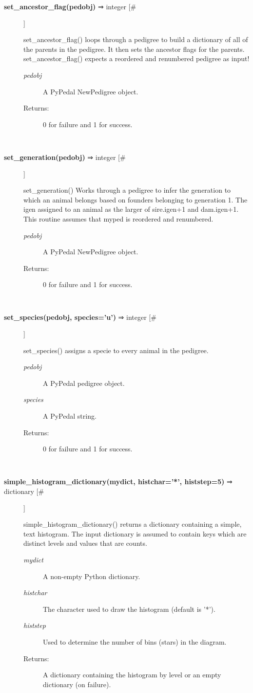 \begin{description}
\item[\textbf{set\_ancestor\_flag(pedobj)} ⇒ integer [\#]
]
\par set\_ancestor\_flag() loops through a pedigree to build a dictionary of all of the parents
in the pedigree.  It then sets the ancestor flags for the parents.  set\_ancestor\_flag()
expects a reordered and renumbered pedigree as input!
\begin{description}
\item[\textit{pedobj}
]
A PyPedal NewPedigree object.
\item[Returns:
]
0 for failure and 1 for success.
\end{description}\\

\item[\textbf{set\_generation(pedobj)} ⇒ integer [\#]
]
\par set\_generation() Works through a pedigree to infer the generation to which an animal
belongs based on founders belonging to generation 1.  The igen assigned to an animal
as the larger of sire.igen+1 and dam.igen+1.  This routine assumes that myped is
reordered and renumbered.
\begin{description}
\item[\textit{pedobj}
]
A PyPedal NewPedigree object.
\item[Returns:
]
0 for failure and 1 for success.
\end{description}\\

\item[\textbf{set\_species(pedobj, species='u')} ⇒ integer [\#]
]
\par set\_species() assigns a specie to every animal in the pedigree.
\begin{description}
\item[\textit{pedobj}
]
A PyPedal pedigree object.
\item[\textit{species}
]
A PyPedal string.
\item[Returns:
]
0 for failure and 1 for success.
\end{description}\\

\item[\textbf{simple\_histogram\_dictionary(mydict, histchar='*', histstep=5)} ⇒ dictionary [\#]
]
\par simple\_histogram\_dictionary() returns a dictionary containing a simple, text histogram.
The input dictionary is assumed to contain keys which are distinct levels and values
that are counts.
\begin{description}
\item[\textit{mydict}
]
A non-empty Python dictionary.
\item[\textit{histchar}
]
The character used to draw the histogram (default is '*').
\item[\textit{histstep}
]
Used to determine the number of bins (stars) in the diagram.
\item[Returns:
]
A dictionary containing the histogram by level or an empty dictionary (on failure).
\end{description}\\


\end{description}
